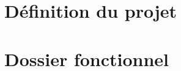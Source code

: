 \documentclass[11pt,fleqn]{book} %
\begin{document}
\renewcommand{\bibname}{Références bibliographiques}  %
\renewcommand{\glossaryname}{Glossaire}               %



\newpage



\pagestyle{empty} %
\tableofcontents  %
\cleardoublepage  %

\frontmatter   %




\mainmatter       %
\pagestyle{fancy} %

\part{Définition du projet}



\part{Dossier fonctionnel}


%
%
% 
%
\end{document}

